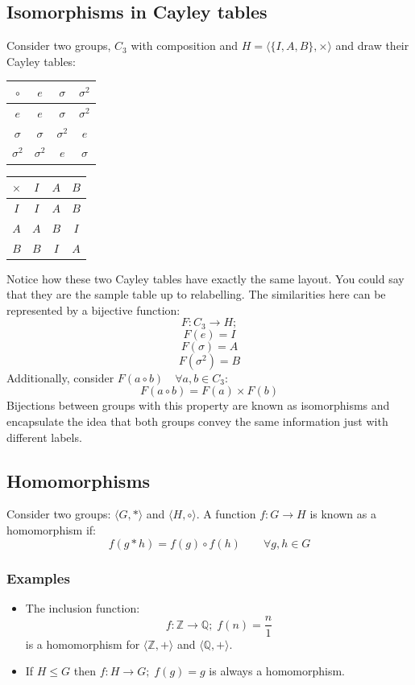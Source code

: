 \documentclass[12pt]{article}
\begin{document}
\subsection*{Isomorphisms in Cayley tables}
Consider two groups, \(C_3\) with composition and \(H=\langle \{I,A,B\}, \times\rangle\) and draw their Cayley tables:
\begin{table}[H]
    \centering
    \begin{tabular}{c|c c c}
        \(\circ\) & \(e\) & \(\sigma\) & \(\sigma^2\) \\ \hline
        \(e\) & \(e\) & \(\sigma\) & \(\sigma^2\) \\
        \(\sigma\) & \(\sigma\) & \(\sigma^2\) & \(e\) \\
        \(\sigma^2\) & \(\sigma^2\) & \(e\) & \(\sigma\)
    \end{tabular}
\end{table}
\begin{table}[H]
    \centering
    \begin{tabular}{c|c c c}
        \(\times\) & \(I\) & \(A\) & \(B\) \\ \hline
        \(I\) & \(I\) & \(A\) & \(B\) \\
        \(A\) & \(A\) & \(B\) & \(I\) \\
        \(B\) & \(B\) & \(I\) & \(A\)
    \end{tabular}
\end{table}
Notice how these two Cayley tables have exactly the same layout. You could say that they are the sample table up to relabelling. The similarities here can be represented by a bijective function:
\[F:C_3\to H;\]
\[F(e)=I\]
\[F(\sigma)=A\]
\[F(\sigma^2)=B\]
Additionally, consider \(F(a\circ b)\quad \forall a,b\in C_3\):
\[F(a\circ b)=F(a)\times F(b)\]
Bijections between groups with this property are known as isomorphisms and encapsulate the idea that both groups convey the same information just with different labels.
\subsection*{Homomorphisms}
Consider two groups: \(\langle G,*\rangle\) and \(\langle H,\circ\rangle\). A function \(f:G\to H\) is known as a homomorphism if:
\[f(g*h)=f(g)\circ f(h)\qquad\forall g,h\in G\]
\subsubsection*{Examples}
\begin{itemize}
    \item The inclusion function:
    \[f:\mathbb{Z}\to\mathbb{Q};\; f(n)=\frac{n}{1}\]
    is a homomorphism for \(\langle\mathbb{Z},+\rangle\) and \(\langle\mathbb{Q},+\rangle\).
    \item If \(H\leqslant G\) then \(f:H\to G;\;f(g)=g\) is always a homomorphism.
\end{itemize}
\end{document}
